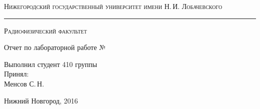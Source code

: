 \begin{titlepage}

\begin{center}

{\small\textsc{Нижегородский государственный университет имени Н.\,И. Лобачевского}}
\vskip 1pt \hrule \vskip 3pt
{\small\textsc{Радиофизический факультет}}

\vfill

{\Large Отчет по лабораторной работе №\labnumber\vskip 12pt\bfseries \labtheme}
	
\end{center}

\vfill
	
\begin{flushright}
	{Выполнил студент 410 группы\\ \labauthor\vskip 12pt Принял:\\ Менсов С.\,Н.}
\end{flushright}
	
\vfill
	
\begin{center}
	Нижний Новгород, 2016
\end{center}

\end{titlepage}


